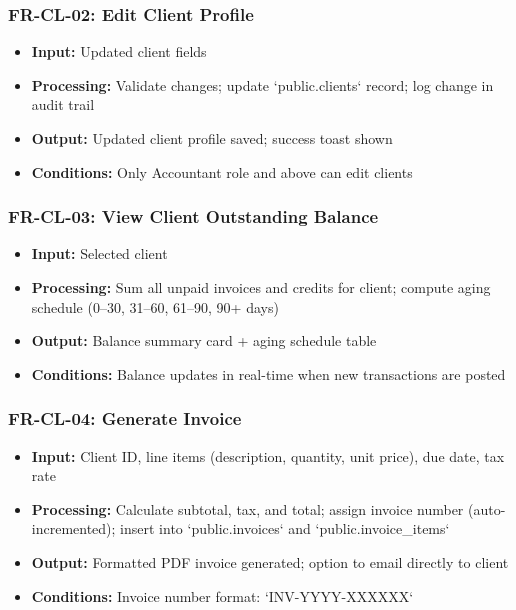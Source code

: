 \documentclass[journal, a4paper, onecolumn, 12pt]{IEEEtran}
\begin{document}
\subsubsection{FR-CL-02: Edit Client Profile}
\begin{itemize}[leftmargin=*]
\item \textbf{Input:} Updated client fields
\item \textbf{Processing:} Validate changes; update `public.clients` record; log change in audit trail
\item \textbf{Output:} Updated client profile saved; success toast shown
\item \textbf{Conditions:} Only Accountant role and above can edit clients
\end{itemize}

\subsubsection{FR-CL-03: View Client Outstanding Balance}
\begin{itemize}[leftmargin=*]
\item \textbf{Input:} Selected client
\item \textbf{Processing:} Sum all unpaid invoices and credits for client; compute aging schedule (0–30, 31–60, 61–90, 90+ days)
\item \textbf{Output:} Balance summary card + aging schedule table
\item \textbf{Conditions:} Balance updates in real-time when new transactions are posted
\end{itemize}

\subsubsection{FR-CL-04: Generate Invoice}
\begin{itemize}[leftmargin=*]
\item \textbf{Input:} Client ID, line items (description, quantity, unit price), due date, tax rate
\item \textbf{Processing:} Calculate subtotal, tax, and total; assign invoice number (auto-incremented); insert into `public.invoices` and `public.invoice\_items`
\item \textbf{Output:} Formatted PDF invoice generated; option to email directly to client
\item \textbf{Conditions:} Invoice number format: `INV-YYYY-XXXXXX`
\end{itemize}
\end{document}

